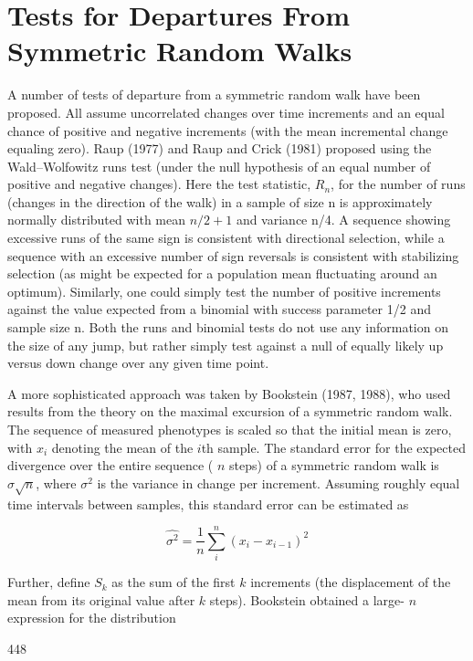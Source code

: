 \documentclass{article}
\begin{document}
\section{Tests for Departures From Symmetric Random Walks}
A number of tests of departure from a symmetric random walk have been proposed. All assume uncorrelated changes over time increments and an equal chance of positive and negative increments (with the mean incremental change equaling zero). Raup (1977) and Raup and Crick (1981) proposed using the Wald–Wolfowitz runs test (under the null hypothesis of an equal number of positive and negative changes). Here the test statistic,  $ R_{n} $, for the number of runs (changes in the direction of the walk) in a sample of size n is approximately normally distributed with mean  $ n/2 + 1 $ and variance n/4. A sequence showing excessive runs of the same sign is consistent with directional selection, while a sequence with an excessive number of sign reversals is consistent with stabilizing selection (as might be expected for a population mean fluctuating around an optimum). Similarly, one could simply test the number of positive increments against the value expected from a binomial with success parameter 1/2 and sample size n. Both the runs and binomial tests do not use any information on the size of any jump, but rather simply test against a null of equally likely up versus down change over any given time point.

A more sophisticated approach was taken by Bookstein (1987, 1988), who used results from the theory on the maximal excursion of a symmetric random walk. The sequence of measured phenotypes is scaled so that the initial mean is zero, with  $ x_i $ denoting the mean of the  $ i $th sample. The standard error for the expected divergence over the entire sequence ( $ n $ steps) of a symmetric random walk is  $ \sigma\sqrt{n} $, where  $ \sigma^2 $ is the variance in change per increment. Assuming roughly equal time intervals between samples, this standard error can be estimated as

\begin{equation}
\widehat{\sigma^{2}}=\frac{1}{n}\sum_{i}^{n}(x_{i}-x_{i-1})^{2}
\tag{12.23a}
\label{eq:12_23a}
\end{equation}

Further, define  $ S_k $ as the sum of the first  $ k $ increments (the displacement of the mean from its original value after  $ k $ steps). Bookstein obtained a large- $ n $ expression for the distribution

448
\end{document}

